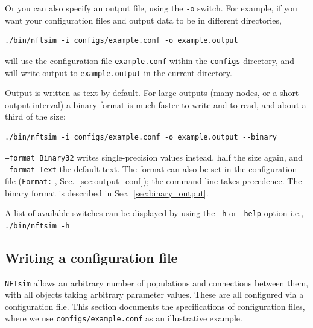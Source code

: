 \documentclass[12pt,a4paper]{article}
\newcommand{\type}[1]{{\small\small\tt #1} }
\newcommand{\NF}[0]{\type{NFTsim}}
\begin{document}
Or you can also specify an output file, using the \type{-o} switch. For example, if you want your configuration files and output data to be in different directories,

\begin{lstlisting}
./bin/nftsim -i configs/example.conf -o example.output
\end{lstlisting}

will use the configuration file \type{example.conf} within the \type{configs} directory, and will write output to \type{example.output} in the current directory.

Output is written as text by default.
For large outputs (many nodes, or a short output interval) a binary format is much faster to write and to read, and about a third of the size:
\begin{lstlisting}
./bin/nftsim -i configs/example.conf -o example.output --binary
\end{lstlisting}
\type{--format Binary32} writes single-precision values instead, half the size again, and \type{--format Text} the default text.
The format can also be set in the configuration file (\type{Format:}, Sec.~\ref{sec:output_conf}); the command line takes precedence.
The binary format is described in Sec.~\ref{sec:binary_output}.

A list of available switches can be displayed by using the \type{-h} or \type{--help} option i.e., \type{./bin/nftsim -h}

\subsection{Writing a configuration file}
\label{sec:config}

\NF allows an arbitrary number of populations and connections between them, with all objects taking arbitrary parameter values. These are all configured via a configuration file. This section documents the specifications of configuration files, where we use \type{configs/example.conf} as an illustrative example.
\end{document}

